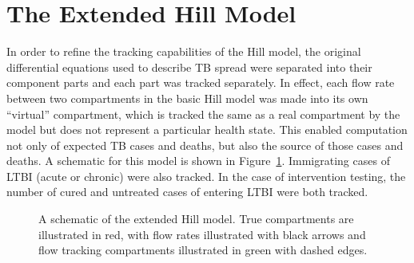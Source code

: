 \documentclass{amsart}
\renewcommand{\(}{\left(}
\renewcommand{\)}{\right)}
\begin{document}
\section{The Extended Hill Model}
\label{sec:extendHill}
In order to refine the tracking capabilities of the Hill model, the original
differential equations used to describe TB spread were separated into their
component parts and each part was tracked separately. In effect, each flow rate
between two compartments in the basic Hill model was made into its own
``virtual'' compartment, which is tracked the same as a real compartment by the
model but does not represent a particular health state. This enabled computation
not only of expected TB cases and deaths, but also the source of those cases and
deaths. A schematic for this model is shown in Figure~\ref{fig:extendedHill}.
Immigrating cases of LTBI (acute or chronic) were also tracked. In the case of
intervention testing, the number of cured and untreated cases of entering LTBI
were both tracked. 

\begin{figure}[h]
  \centering
  
  \caption{A schematic of the extended Hill model. True compartments are
    illustrated in red, with flow rates illustrated with black arrows and flow
    tracking compartments illustrated in green with dashed edges.
  }
  \label{fig:extendedHill}
\end{figure}
\end{document}

